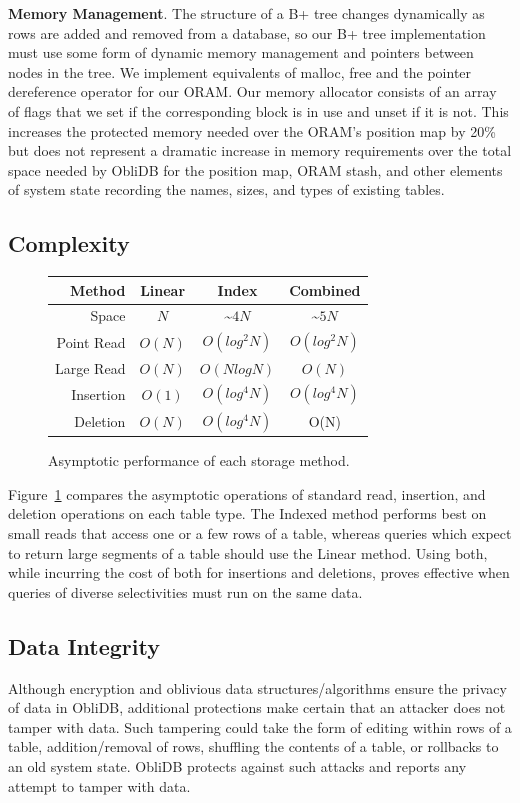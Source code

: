 \documentclass[letterpaper,twocolumn,10pt]{article}
\def\name/{ObliDB}
\begin{document}
\noindent \textbf{Memory Management}. The structure of a B+ tree changes dynamically as rows are added and removed from a database, so our B+ tree implementation must use some form of dynamic memory management and pointers between nodes in the tree. We implement equivalents of malloc, free and the pointer dereference operator for our ORAM. Our memory allocator consists of an array of flags that we set if the corresponding block is in use and unset if it is not. This increases the protected memory needed over the ORAM's position map by 20\% but does not represent a dramatic increase in memory requirements over the total space needed by \name/ for the position map, ORAM stash, and other elements of system state recording the names, sizes, and types of existing tables.

\subsection{Complexity}
\begin{figure}
\small
\center
\begin{tabular}{r|ccc}
Method&Linear&Index&Combined\\\hline
Space &$N$&\textasciitilde$4N$&\textasciitilde$5N$\\
Point Read&$O(N)$&$O(log^2N)$&$O(log^2N)$\\
Large Read&$O(N)$&$O(NlogN)$&$O(N)$\\
Insertion&$O(1)$&$O(log^4N)$&$O(log^4N)$\\
Deletion&$O(N)$&$O(log^4N)$&O(N)\\
\end{tabular}
\caption{\small Asymptotic performance of each storage method.}
\label{asymTables}
\end{figure}
Figure~\ref{asymTables} compares the asymptotic operations of standard read, insertion, and deletion operations on each table type. The Indexed method performs best on small reads that access one or a few rows of a table, whereas queries which expect to return large segments of a table should use the Linear method. Using both, while incurring the cost of both for insertions and deletions, proves effective when queries of diverse selectivities must run on the same data.

\subsection{Data Integrity}
Although encryption and oblivious data structures/algorithms ensure the privacy of data in \name/, additional protections make certain that an attacker does not tamper with data. Such tampering could take the form of editing within rows of a table, addition/removal of rows, shuffling the contents of a table, or rollbacks to an old system state. \name/ protects against such attacks and reports any attempt to tamper with data.
\end{document}
